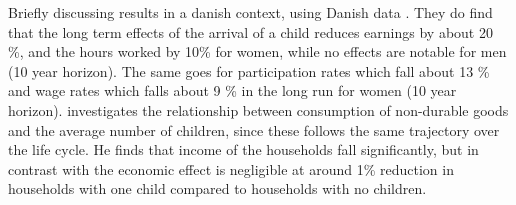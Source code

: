 Briefly discussing results in a danish context, using Danish data \textcite{kleven_children_2019}. They do find that the long term effects of the arrival of a child reduces earnings by about 20 \%, and the hours worked by 10\% for women, while no effects are notable for men (10 year horizon). The same goes for participation rates which fall about 13 \% and wage rates which falls about 9 \% in the long run for women (10 year horizon). \textcite{jorgensen_life-cycle_2017} investigates the relationship between consumption of non-durable goods and the average number of children, since these follows the same trajectory over the life cycle. He finds that income of the households fall significantly, but in contrast with \textcite{kleven_children_2019} the economic effect is negligible at around 1\% reduction in households with one child compared to households with no children. 
